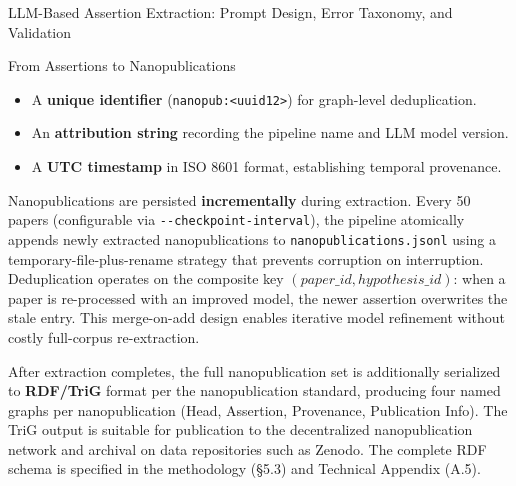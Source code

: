 \documentclass[
  ignorenonframetext,
]{beamer}
\providecommand{\tightlist}{%
  \setlength{\itemsep}{0pt}\setlength{\parskip}{0pt}}
\begin{document}
\begin{frame}[fragile]{LLM-Based Assertion Extraction: Prompt Design,
Error Taxonomy, and Validation \label{sec:extraction_pipeline}}
\begin{block}{From Assertions to Nanopublications}
\begin{itemize}
\tightlist
\item
  A \textbf{unique identifier}
  (\texttt{nanopub:\textless{}uuid12\textgreater{}}) for graph-level
  deduplication.
\item
  An \textbf{attribution string} recording the pipeline name and LLM
  model version.
\item
  A \textbf{UTC timestamp} in ISO 8601 format, establishing temporal
  provenance.
\end{itemize}

Nanopublications are persisted \textbf{incrementally} during extraction.
Every 50 papers (configurable via \texttt{-\/-checkpoint-interval}), the
pipeline atomically appends newly extracted nanopublications to
\texttt{nanopublications.jsonl} using a temporary-file-plus-rename
strategy that prevents corruption on interruption. Deduplication
operates on the composite key \((paper\_id, hypothesis\_id)\): when a
paper is re-processed with an improved model, the newer assertion
overwrites the stale entry. This merge-on-add design enables iterative
model refinement without costly full-corpus re-extraction.

After extraction completes, the full nanopublication set is additionally
serialized to \textbf{RDF/TriG} format per the nanopublication standard,
producing four named graphs per nanopublication (Head, Assertion,
Provenance, Publication Info). The TriG output is suitable for
publication to the decentralized nanopublication network and archival on
data repositories such as Zenodo. The complete RDF schema is specified
in the methodology (§5.3) and Technical Appendix (A.5).
\end{block}
\end{frame}
\end{document}
